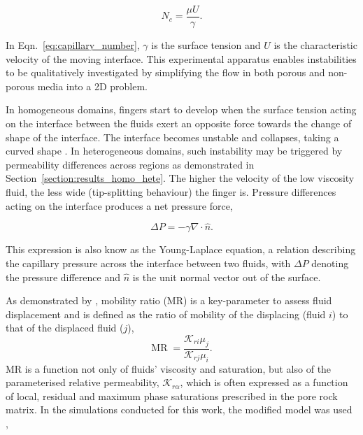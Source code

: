 \documentclass[preprint,authoryear,12pt]{elsarticle}
\begin{document}
\begin{equation}
N_{c} = \frac{\mu U}{\gamma}.
\label{eq:capillary_number}
\end{equation}

\noindent In Eqn.~\ref{eq:capillary_number}, $\gamma$ is the surface tension and $U$ is the characteristic velocity of the moving interface. This experimental apparatus enables instabilities to be qualitatively investigated by simplifying the flow in both porous and non-porous media into a 2D problem. 

\medskip
In homogeneous domains, fingers start to develop when the surface tension acting on the interface between the fluids exert an opposite force towards the change of shape of the interface. The interface becomes unstable and collapses, taking a curved shape \citep{homsy_1987, jackson_2017}. In heterogeneous domains, such instability may be triggered by permeability differences across regions as demonstrated in Section~\ref{section:results_homo_hete}. The higher the velocity of the low viscosity fluid, the less wide (tip-splitting behaviour) the finger is. Pressure differences acting on the interface produces a net pressure force,      

\begin{equation} 
\Delta P= - \gamma \nabla\cdot\hat{n}. 
\label{eq:pressure_dif} 
\end{equation}

\noindent This expression is also know as the Young-Laplace equation, a relation describing the capillary pressure across the interface between two fluids, with $\Delta P$ denoting the pressure difference and $\hat{n}$ is the unit normal vector out of the surface. 

\medskip
As demonstrated by \citet{habermann_1960} \citep[see also][]{budek_2017}, mobility ratio (MR) is a key-parameter to assess fluid displacement and is defined as the ratio of mobility of the displacing (fluid $i$) to that of the displaced fluid ($j$),
\begin{equation}
 \text{MR} \; = \frac{\mathcal{K}_{ri} \mu_{j}}{\mathcal{K}_{rj} \mu_{i}}. 
\label{eq:MR}
\end{equation}
MR is a function not only of fluids' viscosity and saturation, but also of the parameterised relative permeability, $\mathcal{K}_{r\alpha}$, which is often expressed as a function of local, residual and maximum phase saturations prescribed in the pore rock matrix. In the simulations conducted for this work, the modified \cite{Brooks_1964} model was used \citep{alpak_1999},
\end{document}
